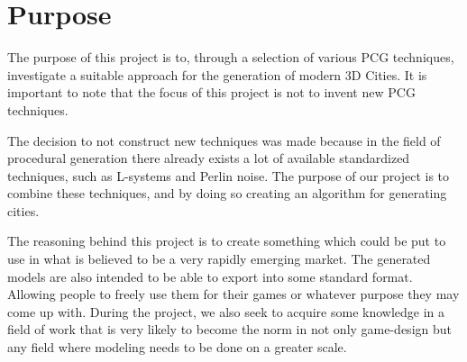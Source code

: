 \section{Purpose}
The purpose of this project is to, through a selection of various PCG techniques, investigate a suitable approach for the generation of modern 3D Cities. 
It is important to note that the focus of this project is not to invent new PCG techniques.  

The decision to not construct new techniques was made because in the field of procedural generation there already exists a lot of available standardized techniques, such as L-systems and Perlin noise. 
The purpose of our project is to combine these techniques, and by doing so creating an algorithm for generating cities. 

The reasoning behind this project is to create something which could be put to use in what is believed to be a very rapidly emerging market. 
The generated models are also intended to be able to export into some standard format. 
Allowing people to freely use them for their games or whatever purpose they may come up with. 
During the project, we also seek to acquire some knowledge in a field of work that is very likely to become the norm in not only game-design but any field where modeling needs to be done on a greater scale. 
